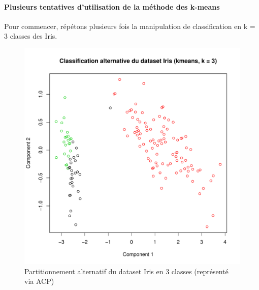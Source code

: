 \documentclass{report}
\begin{document}
\paragraph{Plusieurs tentatives d'utilisation de la méthode des k-means}
Pour commencer, répétons plusieurs fois la manipulation de classification en k = 3 classes des Iris.
\begin{figure}[ht!]
\begin{center}
    \includegraphics[width=\textwidth]{../plots/E3Q2_altCLUSi.pdf}
    \caption{Partitionnement alternatif du dataset Iris en 3 classes (représenté via ACP)}
\end{center}
\end{figure}
\end{document}

